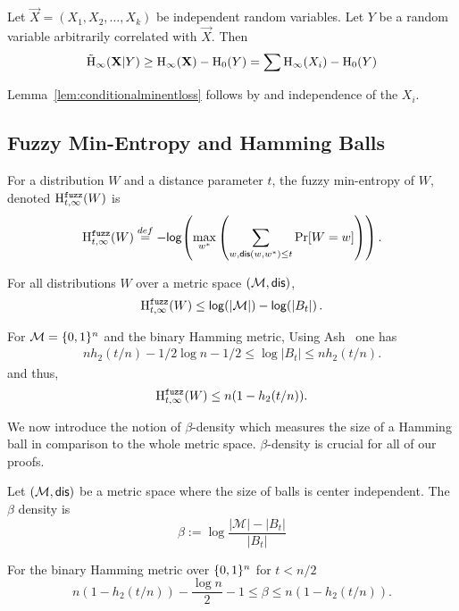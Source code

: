 \begin{lemma}
    \label{lem:conditionalminentloss}
    Let $\vec{X} = (X_1, X_2, \ldots, X_k)$ be independent random variables. 
    Let $Y$ be a random variable arbitrarily correlated with $\vec{X}$. 
    Then 
    \[
        \tilde{\mathrm{H}}_{\infty}\!\left(\mathbf{X}|Y\right) \geq \mathrm{H}_{\infty}\!\left(\mathbf{X}\right) - \mathrm{H}_0\!\left(Y\right) = \sum \mathrm{H}_{\infty}\!\left(X_i\right) - \mathrm{H}_0\!\left(Y\right)
    \]
\end{lemma} 
\noindent
Lemma~\ref{lem:conditionalminentloss} follows by \cite[Lemma 2.2b]{dodis2008fuzzy} and independence of the $X_i$.



\subsection{Fuzzy Min-Entropy and Hamming Balls}
\begin{definition}

For a distribution $W$ and a distance parameter $t$, the fuzzy min-entropy of $W$, denoted $\mathrm{H}^{\mathtt{fuzz}}_{t,\infty}(W)$ is 
\[
\mathrm{H}^{\mathtt{fuzz}}_{t,\infty}(W) \overset{def}= -\mathsf{log}\!\left( \max_{w^*} \left(\sum_{w, \mathsf{dis}(w, w^*)\le t} \Pr[W=w] \right)\right).
\]
\end{definition}

\begin{proposition} \label{lem:max fuzz ent}
For all distributions $W$ over a metric space $(\mathcal{M}, \mathsf{dis})$, 
\[\mathrm{H}^{\mathtt{fuzz}}_{t,\infty}(W) \le \mathsf{log}\!\left(|\mathcal{M}|\right) - \mathsf{log}\!\left(|B_t|\right).
\]
\end{proposition}
\noindent
For $\mathcal{M} = \{0, 1\}^n$ and the binary Hamming metric,
Using Ash~\cite[Lemma 4.7.2, Equation 4.7.5, p. 115]{ash2012information} one has
\begin{align} nh_2(t/n)  -1/2\log{n} - 1/2 \le \log{|B_t|} \le  nh_2(t/n)\label{eq:size of balls}.\end{align}
and thus, 
\[
\mathrm{H}^{\mathtt{fuzz}}_{t,\infty}(W) \le n(1-h_2(t/n)).
\]

\noindent
We now introduce the notion of $\beta$-density which measures the size of a Hamming ball in comparison to the whole metric space.  $\beta$-density is crucial for all of our proofs. 
\begin{definition}
Let $(\mathcal{M}, \mathsf{dis})$ be a metric space where the size of balls is center independent.  The $\beta$ density is
\[
\beta := \log{\frac{|\mathcal{M}|- |B_t|}{|B_t|}} 
\]
\end{definition}
\begin{claim} 
For the binary Hamming metric over $\{0, 1\}^n$ for $t<n/2$
\[
n(1-h_2(t/n))-\frac{\log{n}}{2}-1 \le \beta \le n(1-h_2(t/n)).
\]

\end{claim}

